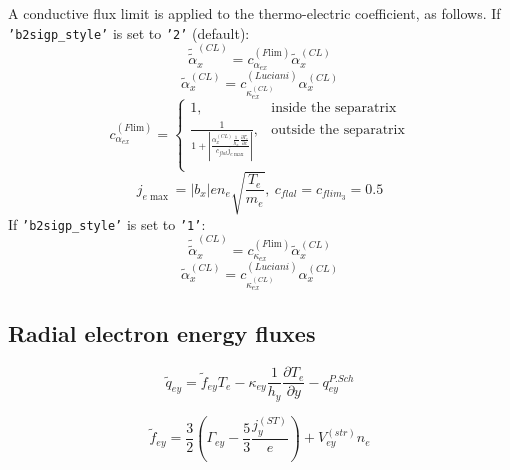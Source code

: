\documentclass[a4paper,10pt]{report}
\begin{document}
A conductive flux limit is applied to the thermo-electric coefficient, as follows.
If {\tt 'b2sigp\_style'} is set to {\tt '2'} (default):
\begin{equation*}
\widetilde{\widetilde{\alpha}}^{(CL)}_{x} = c_{\alpha_{ex}}^{(F\text{lim})} \widetilde{\alpha}^{(CL)}_{x}
\end{equation*}
\begin{equation*}
\widetilde{\alpha}^{(CL)}_{x} = c_{\kappa_{ex}^{(CL)}}^{(Luciani)} \alpha^{(CL)}_{x}
\end{equation*}
\begin{equation*}
c_{\alpha_{ex}}^{(F\text{lim})} = \left\{
\begin{matrix}
1, & \text{inside the separatrix} \\
\frac{1}{1+\left|\frac{\alpha^{(CL)}_{x} \frac{1}{h_x} \frac{\partial T_e}{\partial x}}{c_{flal} j_{e \max}}\right|}, & \text{outside the separatrix} \\
\end{matrix} \right.
\end{equation*}
\begin{equation*}
j_{e \max} = \left| b_x \right| e n_e \sqrt{\frac{T_e}{m_e}}, ~ c_{flal} = c_{flim_3} = 0.5
\end{equation*}
If {\tt 'b2sigp\_style'} is set to {\tt '1'}:
\begin{equation*}
\widetilde{\widetilde{\alpha}}^{(CL)}_{x} = c_{\kappa_{ex}}^{(F\text{lim})} \widetilde{\alpha}^{(CL)}_{x}
\end{equation*}
\begin{equation*}
\widetilde{\alpha}^{(CL)}_{x} = c_{\kappa_{ex}^{(CL)}}^{(Luciani)} \alpha^{(CL)}_{x}
\end{equation*}

\subsection{Radial electron energy fluxes}

\begin{equation*}
\widetilde q_{ey} = \widetilde f_{ey} T_e - \kappa_{ey} \frac 1{h_y} \frac{\partial T_e}{\partial y} - q_{ey}^{P.Sch}
\end{equation*}

\begin{equation*}
\widetilde f_{ey} = \frac 3 2 \left(\Gamma_{ey} - \frac 5 3 \frac{j_y^{\left( ST \right)}} e \right) +
V_{ey}^{(str)} n_e
\end{equation*}
\end{document}
